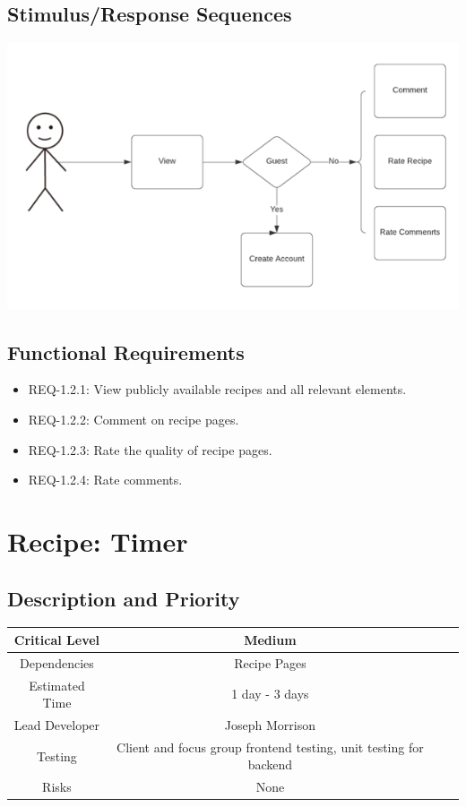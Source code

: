 \documentclass{scrreprt}
\begin{document}
\subsection{Stimulus/Response Sequences}

\includegraphics{FlowCharts/Recipe-Pages.png}

\subsection{Functional Requirements}

\begin{itemize}
    \item REQ-1.2.1: View publicly available recipes and all relevant elements.
    \item REQ-1.2.2: Comment on recipe pages.
    \item REQ-1.2.3: Rate the quality of recipe pages.
    \item REQ-1.2.4: Rate comments.
\end{itemize}

\section{Recipe: Timer}

\subsection{Description and Priority}
\begin{center}
    \begin{tabular}{| c | c | c | c |}
        \hline
        Critical Level & Medium \\
        \hline
        Dependencies & Recipe Pages \\
        \hline
        Estimated Time & 1 day - 3 days \\
        \hline
        Lead Developer & Joseph Morrison \\
        \hline
        Testing & Client and focus group frontend testing, unit testing for backend \\
        \hline
        Risks & None \\
        \hline
    \end{tabular}
\end{center}
\end{document}
